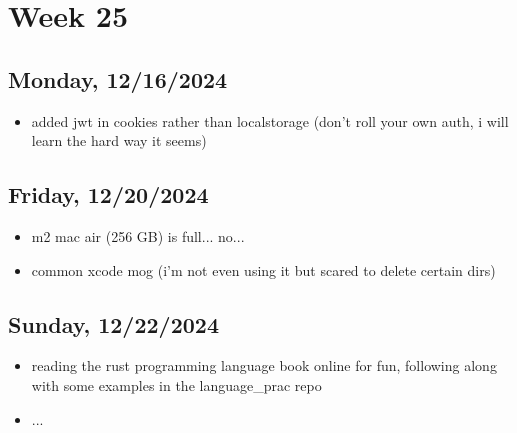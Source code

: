 \newpage
\section{Week 25}

\subsection{Monday, 12/16/2024}
\begin{itemize}
    \item added jwt in cookies rather than localstorage (don't roll your own
        auth, i will learn the hard way it seems)
\end{itemize}

\subsection{Friday, 12/20/2024}
\begin{itemize}
    \item m2 mac air (256 GB) is full... no...
    \item common xcode mog (i'm not even using it but scared to delete certain
        dirs)
\end{itemize}

\subsection{Sunday, 12/22/2024}
\begin{itemize}
    \item reading the rust programming language book online for fun, following
        along with some examples in the language_prac repo
    \item ...
\end{itemize}
